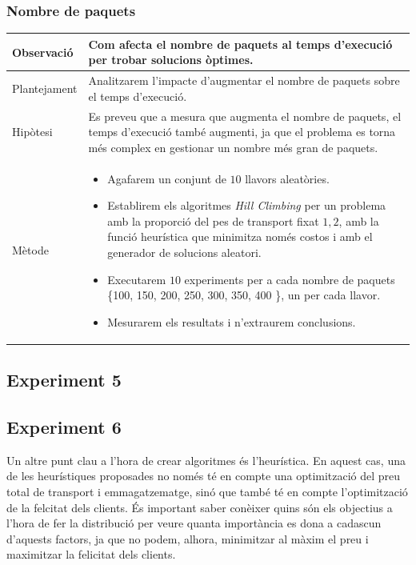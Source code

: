 \documentclass[a4paper]{article}
\begin{document}
	\subsubsection{Nombre de paquets}
	\begin{table}[ht]
		\centering
		\begin{tabular}{|l|p{10cm}|}
			\hline
			Observació & Com afecta el nombre de paquets al temps d'execució per trobar solucions òptimes. \\
			\hline
			Plantejament & Analitzarem l'impacte d'augmentar el nombre de paquets sobre el temps d'execució.\\
			\hline
			Hipòtesi & Es preveu que a mesura que augmenta el nombre de paquets, el temps d'execució també augmenti, ja que el problema es torna més complex en gestionar un nombre més gran de paquets.\\
			\hline
			Mètode &
			\begin{itemize}
				\item Agafarem un conjunt de $10$ llavors aleatòries.
				\item Establirem els algoritmes \textit{Hill Climbing} per un problema amb la proporció del pes de transport fixat  $1,2$, amb la funció heurística que minimitza només costos i amb el generador de solucions aleatori.
				\item Executarem $10$ experiments per a cada nombre de paquets \{100, 150, 200, 250, 300, 350, 400 \}, un per cada llavor.
				\item Mesurarem els resultats i n'extraurem conclusions.
			\end{itemize} \\
			\hline
		\end{tabular}
		\label{tab:exp4b_apartats}
	\end{table}

	\subsection{Experiment 5}
	
	
	\subsection{Experiment 6}
	
	Un altre punt clau a l'hora de crear algoritmes és l'heurística. En aquest cas, una de les heurístiques proposades no només té en compte una optimització del preu total de transport i emmagatzematge, sinó que també té en compte l'optimització de la felcitat dels clients. És important saber conèixer quins són els objectius a l'hora de fer la distribució per veure quanta importància es dona a cadascun d'aquests factors, ja que no podem, alhora, minimitzar al màxim el preu i maximitzar la felicitat dels clients. \\
	
\end{document}
